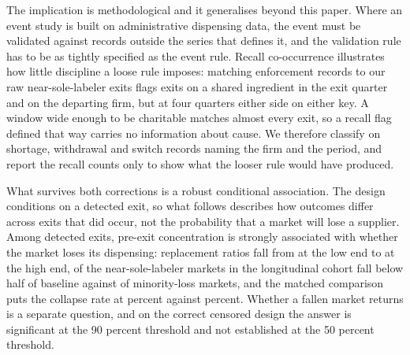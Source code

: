 \documentclass[pdflatex,sn-vancouver-num,Numbered]{sn-jnl}
\begin{document}
The implication is methodological and it generalises beyond this paper. Where an event study is
built on administrative dispensing data, the event must be validated against records outside the
series that defines it, and the validation rule has to be as tightly specified as the event rule.
Recall co-occurrence illustrates how little discipline a loose rule imposes: matching enforcement
records to our \nRawSoleW raw near-sole-labeler exits flags \nRecallIngLevel exits on a shared
ingredient in the exit quarter and \nRecallLabLevel on the departing firm, but \nRecallIngWide at
four quarters either side on either key. A window wide enough to be charitable matches almost
every exit, so a recall flag defined that way carries no information about cause. We therefore
classify on shortage, withdrawal and switch records naming the firm and the period, and report
the recall counts only to show what the looser rule would have produced.

What survives both corrections is a robust conditional association. The design conditions on a
detected exit, so what follows describes how outcomes differ across exits that did occur, not the
probability that a market will lose a supplier. Among detected exits, pre-exit concentration is
strongly associated with whether the market loses its dispensing: replacement ratios fall from \nMinorityMedian at the low end to \nSoleMedian at the
high end, \nCrossSole of the \nCrossSoleOf near-sole-labeler markets in the longitudinal cohort
fall below half of baseline against \nCrossMinor of \nCrossMinorOf minority-loss markets, and
the matched comparison puts the collapse rate at
\nTreatedRate percent against \nControlRate percent. Whether a fallen market returns is a separate question, and on the
correct censored design the answer is significant at the 90 percent threshold and not established
at the 50 percent threshold.
\end{document}
